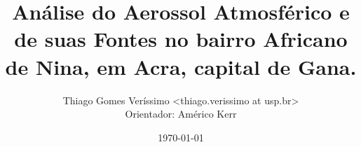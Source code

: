 \documentclass{beamer}
\begin{document}
  \title{Análise do Aerossol Atmosférico e de suas Fontes no bairro Africano de Nina, em Acra, capital de Gana.}
  \author{Thiago Gomes Veríssimo <thiago.verissimo at usp.br> \\
          Orientador: Américo Kerr}
  \date{\today}

\begin{frame}
  \titlepage
\end{frame}

\begin{frame}
  \tableofcontents
\end{frame}






\end{document}
